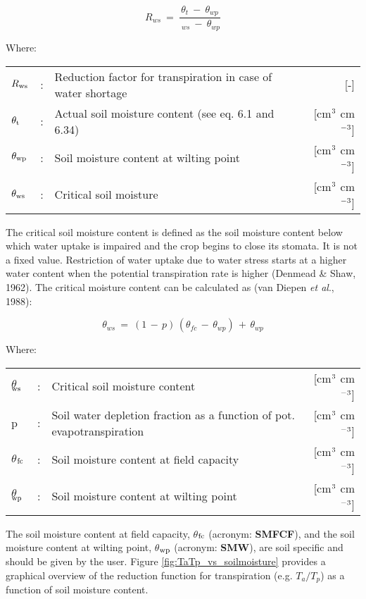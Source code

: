 \begin{equation}
\label{eq:6.8}
R_{ws} ~=~{\frac{\theta_{t} ~-~ \theta  _{wp} }{ \ _{ws} ~-~ \theta_{wp} }}
\end{equation}

Where:\\[5pt]
\begin{tabularx}{\textwidth}{llXr}
	$R_{{\rm ws}}$ &:& Reduction factor for transpiration in case of
	water shortage & [-]\\
	$\theta_{{\rm t}}$ &:& Actual soil moisture content (see eq. 6.1 and 
	6.34) & [cm$^{{\rm 3}}$ cm$^{{\rm -3}}$]\\
	$\theta_{{\rm wp}}$ &:& Soil moisture content at wilting 
	point & [cm$^{{\rm 3}}$ cm$^{{\rm -3}}$]\\
	$\theta_{{\rm ws}}$ &:& Critical soil moisture & [cm$^{{\rm 3}}$ cm$^{{\rm -3}}$]\\ 
\end{tabularx}

The critical soil moisture content is defined as the soil moisture content below
which water uptake is impaired and the crop begins to close its stomata. It is not a fixed
value. Restriction of water uptake due to water stress starts at a higher water content
when the potential transpiration rate is higher (Denmead \& Shaw, 1962). The critical
moisture content can be calculated as (van Diepen {\it et al}., 1988):

\begin{equation}
\label{eq:6.9}
\theta_{ws} ~=~ (1\, -\, p )\, (\theta_{fc} \, -\, \theta_{wp} )\, +\, \theta_{wp} 
\end{equation}

Where:\\[5pt]
\begin{tabularx}{\textwidth}{llXr}
	$\theta$$_{{\rm ws}}$ &:& Critical soil moisture content & [cm$^{{\rm 3}}$ cm$^{{\rm -3}}$]\\
	p &:& Soil water depletion fraction as a function 
	of pot. evapotranspiration & [cm$^{{\rm 3}}$ cm$^{{\rm -3}}$]\\
	$\theta$$_{{\rm fc}}$ &:& Soil moisture content at field capacity & [cm$^{{\rm 3}}$ cm$^{{\rm -3}}$]\\
	$\theta$$_{{\rm wp}}$ &:& Soil moisture content at wilting point & [cm$^{{\rm 3}}$ cm$^{{\rm -3}}$]\\
\end{tabularx}

The soil moisture content at field capacity, {\bf $\theta$$_{{\rm fc}}$} (acronym: {\bf SMFCF}), 
and the soil moisture content at wilting point, {\bf $\theta$$_{{\rm wp}}$} (acronym: {\bf SMW}), 
are soil specific and should be given by the user. Figure \ref{fig:TaTp_vs_soilmoisture} provides
a graphical overview of the reduction function for transpiration (e.g. $T_a/T_p$) as a 
function of soil moisture content.

